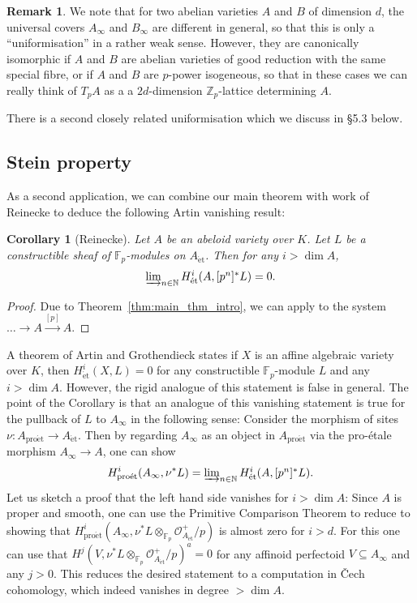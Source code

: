 \documentclass[10pt,oneside]{amsart}
\newtheorem{corollary}[theorem]{Corollary}
\theoremstyle{definition}
\newtheorem{remark}[theorem]{Remark}
\newcommand{\et}{\operatorname{\acute{e}t}}
\newcommand{\proet}{\operatorname{pro\acute{e}t}}
\renewcommand{\O}{\mathcal{O}}
\newcommand{\N}{\mathbb{N}}
\newcommand{\F}{\mathbb{F}}
\begin{document}
	\begin{center}
	\end{center}
	\begin{remark}
	We note that for two abelian varieties $A$ and $B$ of dimension $d$, the universal covers $A_\infty$ and $B_\infty$ are different in general, so that this is only a ``uniformisation'' in a rather weak sense. However, they are canonically isomorphic if $A$ and $B$ are abelian varieties of good reduction with the same special fibre, or if $A$ and $B$ are $p$-power isogeneous, so that in these cases we can really think of $T_pA$ as a a $2d$-dimension $\mathbb Z_p$-lattice determining $A$.
	\end{remark}
	 There is a second closely related uniformisation which we discuss in \S5.3 below.
	\subsection{Stein property}
	As a second application, we can combine our main theorem with work of Reinecke to deduce the following Artin vanishing result:
	\begin{corollary}[Reinecke]
		Let $A$ be an abeloid variety over $K$. Let $L$ be a constructible sheaf of $\mathbb F_p$-modules on $A_{\et}$. Then for any $i>\dim A$,
		\[\textstyle\varinjlim_{n\in \mathbb N}H_{\et}^i(A,[p^n]^{\ast}L)=0.\]
	\end{corollary}
	\begin{proof}
	Due to Theorem~\ref{thm:main_thm_intro}, we can apply \cite[Theorem 3.3]{Reinecke} to the system $\dots \rightarrow A\xrightarrow{[p]}A$.
	\end{proof}
	A theorem of Artin and Grothendieck states if $X$ is an affine algebraic variety over $K$, then $H_{\et}^i(X,L)=0$ for any constructible $\mathbb F_p$-module $L$ and any $i>\dim A$. However, the rigid analogue of this statement is false in general. The point of the Corollary is that an analogue of this vanishing statement is true for the pullback of $L$ to $A_\infty$ in the following sense: Consider the morphism of sites $\nu\colon A_{\proet}\to A_{\et}$. Then by regarding $A_\infty$ as an object in $A_{\proet}$ via the pro-\'etale morphism $A_\infty\to A$, one can show
	\[H^i_{\proet}(A_\infty,\nu^{\ast}L)=\textstyle\varinjlim_{n\in\N} H^i_{\et}(A,[p^n]^{\ast}L). \]
	Let us sketch a proof that the left hand side vanishes  for $i>\dim A$:
	Since $A$ is proper and smooth, one can use the Primitive Comparison Theorem \cite[Theorem~5.1]{p-adic_Hodge} \cite[Theorem~3.13]{survey} to reduce to showing that $H^i_{\proet}(A_\infty,\nu^{\ast}L\otimes_{\F_p} \O_{A_{\et}}^+/p)$ is almost zero for $i>d$. For this one can use that $H^j(V,\nu^{\ast}L\otimes_{\F_p} \O_{A_{\et}}^+/p)^a=0$ for any affinoid perfectoid $V\subseteq A_\infty$ and any $j>0$. This reduces the desired statement to a computation in \v{C}ech cohomology, which indeed vanishes in degree $>\dim A$.
\end{document}
